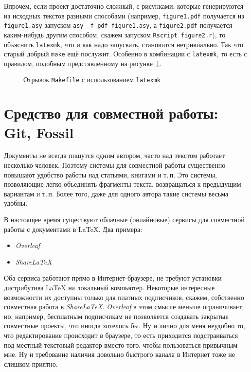 \documentclass[a4paper,12pt,hyphens]{article}
\newcommand\softname[1]{\textit{#1}}
\newcommand\exe[1]{\texttt{#1}}
\newcommand\file[1]{\texttt{#1}}
\begin{document}
Впрочем, если проект достаточно сложный, с рисунками, которые генерируются
из исходных текстов разными способами (например, \file{figure1.pdf}
получается из \file{figure1.asy} запуском \verb|asy -f pdf figure1.asy|,
а \file{figure2.pdf} получается каким-нибудь другим способом, скажем
запуском \verb|Rscript figure2.r|), то объяснить \exe{latexmk}, что и как
надо запускать, становится нетривиально. Так что старый добрый \exe{make}
ещё послужит. Особенно в комбинации с \exe{latexmk}, то есть с правилом,
подобным представленному на рисунке~\ref{latexmk3}.
\begin{figure}[tp]
\caption{Отрывок \file{Makefile} с использованием
\exe{latexmk}}\label{latexmk3}
\end{figure}

\section{Средство для совместной работы: Git, Fossil}
Документы не всегда пишутся одним автором, часто над текстом работает несколько
человек. Поэтому системы для совместной работы существенно повышают удобство работы
над статьями, книгами и т.\,п. Это системы, позволяющие легко объединять фрагменты
текста, возвращаться к предыдущим вариантам и т.\,п. Более того, даже для одного автора
такие системы весьма удобны.

В настоящее время существуют облачные (онлайновые) сервисы для совместной работы с
документами в \LaTeX{}. Два примера:
\begin{itemize}
  \item \softname{Overleaf} \parencite{site-overleaf}
  \item \softname{ShareLaTeX} \parencite{site-sharelatex}
\end{itemize}
Оба сервиса работают прямо в Интернет-браузере, не требуют установки дистрибутива
\LaTeX{} на локальный компьютер. Некоторые интересные возможности их доступны только
для платных подписчиков, скажем, собственно совместная работа в \softname{ShareLaTeX}.
\softname{Overleaf} в этом смысле меньше ограничивает, но, например, бесплатным
подписчикам не позволяется создавать закрытые совместные проекты, что иногда
хотелось бы. Ну и лично для меня неудобно то, что редактирование происходит в
браузере, то есть приходится подстраиваться под местный текстовый редактор
вместо того, чтобы пользоваться привычным мне. Ну и требование наличия довольно
быстрого канала в Интернет тоже не слишком приятно.
\end{document}
